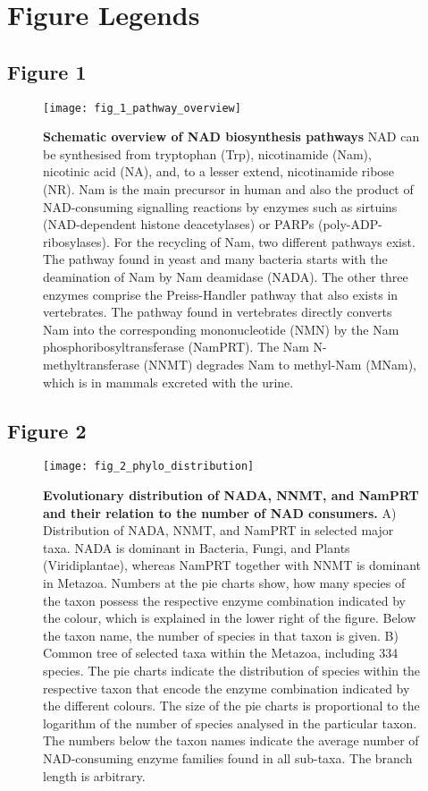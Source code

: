 
\newpage

\section{Figure Legends}

\subsection{Figure 1}

\begin{figure}[ht]
  \centering
  \texttt{[image: fig\_1\_pathway\_overview]}
  \caption{\textbf{Schematic overview of NAD biosynthesis pathways} NAD can be synthesised from tryptophan (Trp), nicotinamide (Nam), nicotinic acid (NA), and, to a lesser extend, nicotinamide ribose (NR). Nam is the main precursor in human and also the product of NAD-consuming signalling reactions by enzymes such as sirtuins (NAD-dependent histone deacetylases) or PARPs (poly-ADP-ribosylases). For the recycling of Nam, two different pathways exist. The pathway found in yeast and many bacteria starts with the deamination of Nam by Nam deamidase (NADA). The other three enzymes comprise the Preiss-Handler pathway that also exists in vertebrates. The pathway found in vertebrates directly converts Nam into the corresponding mononucleotide (NMN) by the Nam phosphoribosyltransferase (NamPRT). The Nam N-methyltransferase (NNMT) degrades Nam to methyl-Nam (MNam), which is in mammals excreted with the urine.}
  \label{fig:pathway_overview}
\end{figure}

\newpage


\subsection{Figure 2}

\begin{figure}[ht]
  \centering
  \texttt{[image: fig\_2\_phylo\_distribution]}
  \caption{\textbf{Evolutionary distribution of NADA, NNMT, and NamPRT and their relation to the number of NAD consumers.} A) Distribution of NADA, NNMT, and NamPRT in selected major taxa. NADA is dominant in Bacteria, Fungi, and Plants (Viridiplantae), whereas NamPRT together with NNMT is dominant in Metazoa. Numbers at the pie charts show, how many species of the taxon possess the respective enzyme combination indicated by the colour, which is explained in the lower right of the figure. Below the taxon name, the number of species in that taxon is given. B) Common tree of selected taxa within the Metazoa, including 334 species. The pie charts indicate the distribution of species within the respective taxon that encode the enzyme combination indicated by the different colours. The size of the pie charts is proportional to the logarithm of the number of species analysed in the particular taxon. The numbers below the taxon names indicate the average number of NAD-consuming enzyme families found in all sub-taxa. The branch length is arbitrary.}
  \label{fig:phylo_distribution}
\end{figure}

